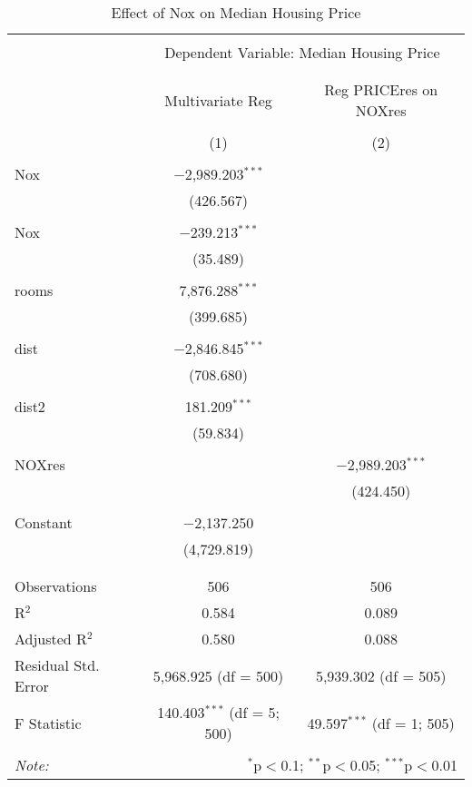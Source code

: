 
\begin{table}[!htbp] \centering 
  \caption{Effect of Nox on Median Housing Price} 
  \label{} 
\begin{tabular}{@{\extracolsep{5pt}}lcc} 
\\[-1.8ex]\hline 
\hline \\[-1.8ex] 
 & \multicolumn{2}{c}{Dependent Variable: Median Housing Price} \\ 
\cline{2-3} 
\\[-1.8ex] &  &  \\ 
 & Multivariate Reg & Reg PRICEres on NOXres \\ 
\\[-1.8ex] & (1) & (2)\\ 
\hline \\[-1.8ex] 
 Nox & $-$2,989.203$^{***}$ &  \\ 
  & (426.567) &  \\ 
  & & \\ 
 Nox & $-$239.213$^{***}$ &  \\ 
  & (35.489) &  \\ 
  & & \\ 
 rooms & 7,876.288$^{***}$ &  \\ 
  & (399.685) &  \\ 
  & & \\ 
 dist & $-$2,846.845$^{***}$ &  \\ 
  & (708.680) &  \\ 
  & & \\ 
 dist2 & 181.209$^{***}$ &  \\ 
  & (59.834) &  \\ 
  & & \\ 
 NOXres &  & $-$2,989.203$^{***}$ \\ 
  &  & (424.450) \\ 
  & & \\ 
 Constant & $-$2,137.250 &  \\ 
  & (4,729.819) &  \\ 
  & & \\ 
\hline \\[-1.8ex] 
Observations & 506 & 506 \\ 
R$^{2}$ & 0.584 & 0.089 \\ 
Adjusted R$^{2}$ & 0.580 & 0.088 \\ 
Residual Std. Error & 5,968.925 (df = 500) & 5,939.302 (df = 505) \\ 
F Statistic & 140.403$^{***}$ (df = 5; 500) & 49.597$^{***}$ (df = 1; 505) \\ 
\hline 
\hline \\[-1.8ex] 
\textit{Note:}  & \multicolumn{2}{r}{$^{*}$p$<$0.1; $^{**}$p$<$0.05; $^{***}$p$<$0.01} \\ 
\end{tabular} 
\end{table} 
